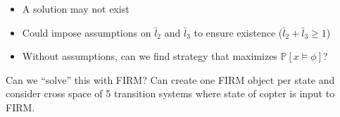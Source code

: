 \documentclass[conference]{IEEEtran}
\begin{document}
\begin{itemize}
  \item A solution may not exist \\
  \item Could impose assumptions on $\bar l_2$ and $\bar l_3$ to ensure existence ($\bar l_2 + \bar l_3 \geq 1$) \\
  \item Without assumptions, can we find strategy that maximizes $\mathbb{P} \left[ x \models \phi \right]$?
\end{itemize}
Can we ``solve'' this with FIRM? Can create one FIRM object per state and consider cross space of 5 transition systems where state of copter is input to FIRM.
\end{document}
